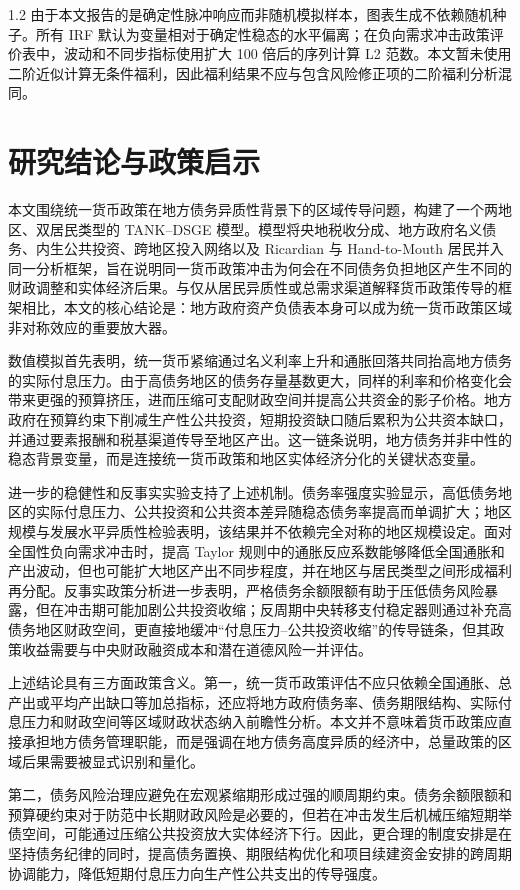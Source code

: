 \documentclass[12pt,UTF8]{ctexart}
\begin{document}
\begin{spacing}{1.2}
		由于本文报告的是确定性脉冲响应而非随机模拟样本，图表生成不依赖随机种子。所有 IRF 默认为变量相对于确定性稳态的水平偏离；在负向需求冲击政策评价表中，波动和不同步指标使用扩大 100 倍后的序列计算 L2 范数。本文暂未使用二阶近似计算无条件福利，因此福利结果不应与包含风险修正项的二阶福利分析混同。
		
		\section{研究结论与政策启示}
		
		本文围绕统一货币政策在地方债务异质性背景下的区域传导问题，构建了一个两地区、双居民类型的 TANK--DSGE 模型。模型将央地税收分成、地方政府名义债务、内生公共投资、跨地区投入网络以及 Ricardian 与 Hand-to-Mouth 居民并入同一分析框架，旨在说明同一货币政策冲击为何会在不同债务负担地区产生不同的财政调整和实体经济后果。与仅从居民异质性或总需求渠道解释货币政策传导的框架相比，本文的核心结论是：地方政府资产负债表本身可以成为统一货币政策区域非对称效应的重要放大器。
		
		数值模拟首先表明，统一货币紧缩通过名义利率上升和通胀回落共同抬高地方债务的实际付息压力。由于高债务地区的债务存量基数更大，同样的利率和价格变化会带来更强的预算挤压，进而压缩可支配财政空间并提高公共资金的影子价格。地方政府在预算约束下削减生产性公共投资，短期投资缺口随后累积为公共资本缺口，并通过要素报酬和税基渠道传导至地区产出。这一链条说明，地方债务并非中性的稳态背景变量，而是连接统一货币政策和地区实体经济分化的关键状态变量。
		
		进一步的稳健性和反事实实验支持了上述机制。债务率强度实验显示，高低债务地区的实际付息压力、公共投资和公共资本差异随稳态债务率提高而单调扩大；地区规模与发展水平异质性检验表明，该结果并不依赖完全对称的地区规模设定。面对全国性负向需求冲击时，提高 Taylor 规则中的通胀反应系数能够降低全国通胀和产出波动，但也可能扩大地区产出不同步程度，并在地区与居民类型之间形成福利再分配。反事实政策分析进一步表明，严格债务余额限额有助于压低债务风险暴露，但在冲击期可能加剧公共投资收缩；反周期中央转移支付稳定器则通过补充高债务地区财政空间，更直接地缓冲“付息压力--公共投资收缩”的传导链条，但其政策收益需要与中央财政融资成本和潜在道德风险一并评估。
		
		上述结论具有三方面政策含义。第一，统一货币政策评估不应只依赖全国通胀、总产出或平均产出缺口等加总指标，还应将地方政府债务率、债务期限结构、实际付息压力和财政空间等区域财政状态纳入前瞻性分析。本文并不意味着货币政策应直接承担地方债务管理职能，而是强调在地方债务高度异质的经济中，总量政策的区域后果需要被显式识别和量化。
		
		第二，债务风险治理应避免在宏观紧缩期形成过强的顺周期约束。债务余额限额和预算硬约束对于防范中长期财政风险是必要的，但若在冲击发生后机械压缩短期举债空间，可能通过压缩公共投资放大实体经济下行。因此，更合理的制度安排是在坚持债务纪律的同时，提高债务置换、期限结构优化和项目续建资金安排的跨周期协调能力，降低短期付息压力向生产性公共支出的传导强度。
		

\end{spacing}
\end{document}
